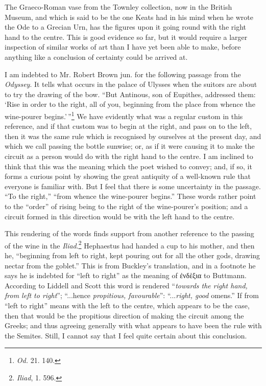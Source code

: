 \documentclass[a4paper, 11pt, oneside, polutonikogreek, english]{article}
\begin{document}
The Graeco-Roman vase from the Townley collection, now in the British Museum, and which is said to be the one Keats had in his mind when he wrote the Ode to a Grecian Urn, has the figures upon it going round with the right hand to the centre. This is good evidence so far, but it would require a larger inspection of similar works of art than I have yet been able to make, before anything like a conclusion of certainty could be arrived at.

I am indebted to Mr. Robert Brown jun. for the following passage from the \emph{Odyssey}. It tells what occurs in the palace of Ulysses when the suitors are about to try the drawing of the bow. ``But Antinous, son of Eupithes, addressed them: `Rise in order to the right, all of you, beginning from the place from whence the wine-pourer begins.'\,''\footnote{\emph{Od.} 21. 140.} We have evidently what was a regular custom in this reference, and if that custom was to begin at the right, and pass on to the left, then it was the same rule which is recognised by ourselves at the present day, and which we call passing the bottle sunwise; or, as if it were causing it to make the circuit as a person would do with the right hand to the centre. I am inclined to think that this was the meaning which the poet wished to convey; and, if so, it forms a curious point by showing the great antiquity of a well-known rule that everyone is familiar with. But I feel that there is some uncertainty in the passage. ``To the right,'' ``from whence the wine-pourer begins.'' These words rather point to the ``order'' of rising being to the right of the wine-pourer's position; and a circuit formed in this direction would be with the left hand to the centre.

This rendering of the words finds support from another reference to the passing of the wine in the \emph{Iliad}.\footnote{\emph{Iliad}, 1. 596.} Hephaestus had handed a cup to his mother, and then he, ``beginning from left to right, kept pouring out for all the other gods, drawing nectar from the goblet.'' This is from Buckley's translation, and in a footnote he says he is indebted for ``left to right'' as the meaning of ἐνδὲξια to Buttmann. According to Liddell and Scott this word is rendered ``\emph{towards the right hand, from left to right}''; ``...hence \emph{propitious, favourable}'': ``...\emph{right, good} omens.'' If from ``left to right'' means with the left to the centre, which appears to be the case, then that would be the propitious direction of making the circuit among the Greeks; and thus agreeing generally with what appears to have been the rule with the Semites. Still, I cannot say that I feel quite certain about this conclusion.
\end{document}
